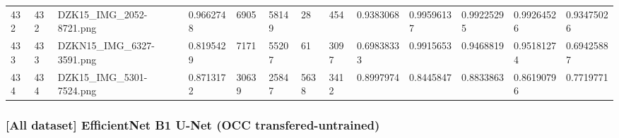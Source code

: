 \documentclass[11pt, a4paper, twoside]{report}
\begin{document}
\begin{longtable}[c]{@{}lllllllllllll@{}}
432 & 432 & DZK15\_IMG\_2052-8721.png & 0.9662748 & 6905 & 58149 & 28 & 454 & 0.9383068 & 0.99596137 & 0.99225295 & 0.99264526 & 0.93475026 \\
433 & 433 & DZKN15\_IMG\_6327-3591.png & 0.8195429 & 7171 & 55207 & 61 & 3097 & 0.69838333 & 0.9915653 & 0.9468819 & 0.95181274 & 0.69425887 \\
434 & 434 & DZK15\_IMG\_5301-7524.png & 0.8713172 & 30639 & 25847 & 5638 & 3412 & 0.8997974 & 0.8445847 & 0.8833863 & 0.86190796 & 0.7719771 \\* \bottomrule
\end{longtable}

\newpage

\subsubsection{[All dataset] EfficientNet B1 U-Net (OCC transfered-untrained)}
\end{document}
